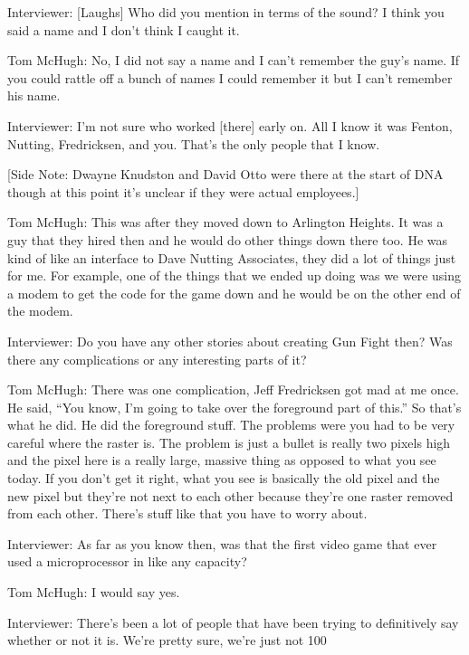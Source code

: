 \textcolor{interviewer}{Interviewer:} [Laughs] Who did you mention in terms of the sound? I think you said a name and I don’t think I caught it.

\textcolor{interviewee}{Tom McHugh:} No, I did not say a name and I can’t remember the guy’s name. If you could rattle off a bunch of names I could remember it but I can’t remember his name.

\textcolor{interviewer}{Interviewer:} I’m not sure who worked [there] early on. All I know it was Fenton, Nutting, Fredricksen, and you. That’s the only people that I know. 

[Side Note: Dwayne Knudston and David Otto were there at the start of DNA though at this point it’s unclear if they were actual employees.]

\textcolor{interviewee}{Tom McHugh:} This was after they moved down to Arlington Heights. It was a guy that they hired then and he would do other things down there too. He was kind of like an interface to Dave Nutting Associates, they did a lot of things just for me. For example, one of the things that we ended up doing was we were using a modem to get the code for the game down and he would be on the other end of the modem.

\textcolor{interviewer}{Interviewer:} Do you have any other stories about creating Gun Fight then? Was there any complications or any interesting parts of it?

\textcolor{interviewee}{Tom McHugh:} There was one complication, Jeff Fredricksen got mad at me once. He said, “You know, I’m going to take over the foreground part of this.” So that’s what he did. He did the foreground stuff. The problems were you had to be very careful where the raster is. The problem is just a bullet is really two pixels high and the pixel here is a really large, massive thing as opposed to what you see today. If you don’t get it right, what you see is basically the old pixel and the new pixel but they’re not next to each other because they’re one raster removed from each other. There’s stuff like that you have to worry about.

\textcolor{interviewer}{Interviewer:} As far as you know then, was that the first video game that ever used a microprocessor in like any capacity?

\textcolor{interviewee}{Tom McHugh:} I would say yes.

\textcolor{interviewer}{Interviewer:} There’s been a lot of people that have been trying to definitively say whether or not it is. We’re pretty sure, we’re just not 100%

